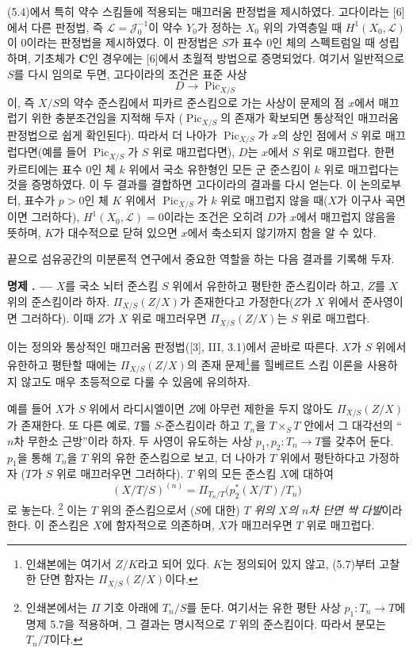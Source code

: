 \documentclass[11pt,twoside,openany]{book}
\numberwithin{equation}{section}
\newcommand{\sourceunit}{front}
\newcommand{\src}[1]{%
  \phantomsection\hypertarget{src:\sourceunit:#1}{}%
  \marginpar{\raggedleft\footnotesize\sffamily #1}%
}
\theoremstyle{plain}
\theoremstyle{definition}
\theoremstyle{remark}
\newcommand{\result}[2]{%
  \par\medskip\noindent\textbf{#1%
  \if\relax\detokenize{#2}\relax\else\space#2\fi. ---}\enspace
}
\begin{document}
(5.4)에서 특히 약수 스킴들에 적용되는 매끄러움 판정법을 제시하였다.
고다이라는 [6]에서 다른 판정법, 즉 $\mathcal L=\mathcal J_0^{-1}$이
약수 $Y_0$가 정하는 $X_0$ 위의 가역층일 때
$H^1(X_0,\mathcal L)$이 0이라는 판정법을 제시하였다. 이 판정법은 $S$가
표수 0인 체의 스펙트럼일 때 성립하며, 기초체가 $\mathbf C$인 경우에는
[6]에서 초월적 방법으로 증명되었다. 여기서 일반적으로 $S$를 다시 임의로
두면, 고다이라의 조건은 표준 사상
\[
D\longrightarrow\operatorname{Pic}_{X/S}
\]
이, 즉 $X/S$의 약수 준스킴에서 피카르 준스킴으로 가는 사상이 문제의 점
$x$에서 매끄럽기 위한 충분조건임을 지적해 두자
($\operatorname{Pic}_{X/S}$의 존재가 확보되면 통상적인 매끄러움 판정법으로
쉽게 확인된다). 따라서 더 나아가 $\operatorname{Pic}_{X/S}$가 $x$의 상인
점에서 $S$ 위로 매끄럽다면(예를 들어 $\operatorname{Pic}_{X/S}$가 $S$ 위로
매끄럽다면), $D$는 $x$에서 $S$ 위로 매끄럽다. 한편 카르티에는 표수 0인
체 $k$ 위에서 국소 유한형인 모든 군 준스킴이 $k$ 위로 매끄럽다는 것을
증명하였다. 이 두 결과를 결합하면 고다이라의 결과를 다시 얻는다. 이
논의로부터, 표수가 $p>0$인 체 $K$ 위에서
$\operatorname{Pic}_{X/S}$가 $k$ 위로 매끄럽지 않을 때($X$가 이구사
곡면이면 그러하다), $H^1(X_0,\mathcal L)=0$이라는 조건은 오히려 $D$가
$x$에서 매끄럽지 않음을 뜻하며, $K$가 대수적으로 닫혀 있으면 $x$에서
축소되지 않기까지 함을 알 수 있다.

끝으로 섬유공간의 미분론적 연구에서 중요한 역할을 하는 다음 결과를
기록해 두자.

\result{명제}{5.7} $X$를 국소 뇌터 준스킴 $S$ 위에서 유한하고 평탄한
준스킴이라 하고, $Z$를 $X$ 위의 준스킴이라 하자.
$\Pi_{X/S}(Z/X)$가 존재한다고 가정한다($Z$가 $X$ 위에서 준사영이면
그러하다). 이때 $Z$가 $X$ 위로 매끄러우면 $\Pi_{X/S}(Z/X)$는 $S$ 위로
매끄럽다.

이는 정의와 통상적인 매끄러움 판정법([3], III, 3.1)에서 곧바로 따른다.
$X$가 $S$ 위에서 유한하고 평탄할 때에는
$\Pi_{X/S}(Z/X)$의 존재 문제\footnote{인쇄본에는 여기서 $Z/K$라고 되어
있다. $K$는 정의되어 있지 않고, (5.7)부터 고찰한 단면 함자는
$\Pi_{X/S}(Z/X)$이다.}를 힐베르트 스킴 이론을 사용하지 않고도 매우
초등적으로 다룰 수 있음에 유의하자.
\src{273}
예를 들어 $X$가 $S$ 위에서 라디시엘이면 $Z$에 아무런 제한을 두지 않아도
$\Pi_{X/S}(Z/X)$가 존재한다. 또 다른 예로, $T$를 $S$-준스킴이라 하고
$T_n$을 $T\times_ST$ 안에서 그 대각선의 ``$n$차 무한소 근방''이라 하자.
두 사영이 유도하는 사상
$p_1,p_2:T_n\longrightarrow T$를 갖추어 둔다. $p_1$을 통해 $T_n$을 $T$
위의 유한 준스킴으로 보고, 더 나아가 $T$ 위에서 평탄하다고 가정하자
($T$가 $S$ 위로 매끄러우면 그러하다). $T$ 위의 모든 준스킴 $X$에 대하여
\[
(X/T/S)^{(n)}=
\Pi_{T_n/T}\bigl(p_2^*(X/T)/T_n\bigr)
\]
로 놓는다.
\footnote{인쇄본에서는 $\Pi$ 기호 아래에 $T_n/S$를 둔다. 여기서는 유한
평탄 사상 $p_1:T_n\to T$에 명제 5.7을 적용하며, 그 결과는 명시적으로
$T$ 위의 준스킴이다. 따라서 분모는 $T_n/T$이다.}
이는 $T$ 위의 준스킴으로서 ($S$에 대한) \emph{$T$ 위의 $X$의 $n$차
단면 싹 다발}이라 한다. 이 준스킴은 $X$에 함자적으로 의존하며, $X$가
매끄러우면 $T$ 위로 매끄럽다.
\end{document}

